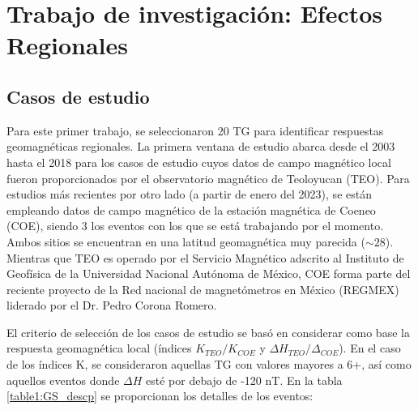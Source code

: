 \chapter{Trabajo de investigación: Efectos Regionales} \label{3}

\section{Casos de estudio}
Para este primer trabajo, se seleccionaron 20 TG para identificar respuestas geomagnéticas regionales. La primera ventana de estudio abarca desde el 2003 hasta el 2018 para los casos de estudio cuyos datos de campo magnético local fueron proporcionados por el observatorio magnético de Teoloyucan (TEO). Para estudios más recientes por otro lado (a partir de enero del 2023), se están empleando datos de campo magnético de la estación magnética de Coeneo (COE), siendo 3 los eventos con los que se está trabajando por el momento. Ambos sitios se encuentran en una latitud geomagnética muy parecida ($\sim 28$). Mientras que TEO es operado por el Servicio Magnético adscrito al Instituto de Geofísica de la Universidad Nacional Autónoma de México, COE forma parte del reciente proyecto de la Red nacional de magnetómetros en México (REGMEX) liderado por el Dr. Pedro Corona Romero.
\vspace{1 em}

El criterio de selección de los casos de estudio se basó en considerar como base la respuesta geomagnética local (índices $K_{TEO}/K_{COE}$ y $\Delta H_{TEO}/\Delta_{COE}$). En el caso de los índices K, se consideraron aquellas TG con valores mayores a 6+, así como aquellos eventos donde $\Delta H$ esté por debajo de -120 nT. En la tabla \ref{table1:GS_descp} se proporcionan los detalles de los eventos:

